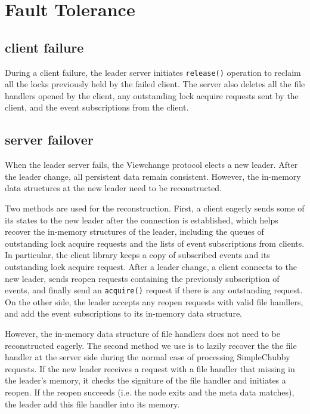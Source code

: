 \section{Fault Tolerance}
\label{section:failure}

\subsection{client failure}

During a client failure, the leader server initiates \texttt{release()} operation
to reclaim all the locks previously held by the failed client. 
The server also deletes all the file handlers opened by the client,
any outstanding lock acquire requests sent by the client, and the
event subscriptions from the client.


\subsection{server failover}

When the leader server fails, the Viewchange protocol elects a new leader. After
the leader change, all persistent data remain consistent. However, the in-memory
data structures at the new leader need to be reconstructed. 

Two methods are used for the reconstruction.
First, a client eagerly sends some of its states to the new leader after the
connection is established, which helps recover the in-memory structures of
the leader, including the queues of outstanding lock acquire requests and
the lists of event subscriptions from clients. In particular, the client library
keeps a copy of subscribed events and its outstanding lock acquire request.
After a leader change, a client connects to the new leader, sends
reopen requests containing the previously subscription of events, and finally
send an \texttt{acquire()} request if there is any outstanding request.
On the other side, the leader accepts any reopen requests with valid file
handlers, and add the event subscriptions to its in-memory data structure.

However, the in-memory data structure of file handlers does not need to be
reconstructed eagerly. The second method we use is to lazily recover the
the file handler at the server side during the normal case of processing
SimpleChubby requests.
If the new leader receives a request with a file handler that
missing in the leader's memory, it checks the signiture of the file
handler and initiates a reopen. If the reopen succeeds (i.e. the node exits
and the meta data matches), the leader add this file handler into its memory.
